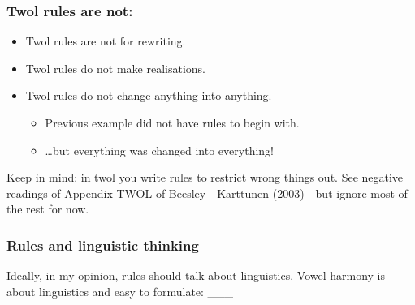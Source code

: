 \documentclass[10pt,xetex]{beamer} %
\begin{document}
\begin{frame}
    \frametitle{Twol rules are not:}
\begin{itemize}
  \item  Twol rules are not for rewriting.
  \item  Twol rules do not make realisations.
  \item  Twol rules do not change anything into anything.
    \begin{itemize}
      \item Previous example did not have rules to begin with.
      \item \ldots but everything was changed into everything!
   \end{itemize}
\end{itemize}
Keep in mind: in twol you write rules to restrict wrong things out. See negative readings of Appendix TWOL of
    Beesley---Karttunen (2003)---but ignore most of the rest for now.
\end{frame}
%


\begin{frame}
    \frametitle{Rules and linguistic thinking}
    Ideally, in my opinion, rules should talk about linguistics. Vowel harmony
    is about linguistics and easy to formulate: \_\_\_
\end{frame}
\end{document}

